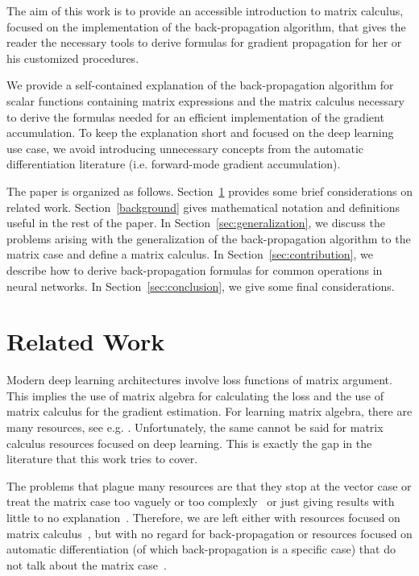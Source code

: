 \documentclass[pdflatex,sn-mathphys-num]{sn-jnl}%
\theoremstyle{thmstyleone}%
\theoremstyle{thmstyletwo}%
\theoremstyle{thmstylethree}%
\begin{document}
The aim of this work is to provide an accessible introduction to matrix calculus, focused on the implementation of the back-propagation algorithm, that gives the reader the necessary tools to derive formulas for gradient propagation for her or his customized procedures.

We provide a self-contained explanation of the back-propagation
algorithm for scalar functions containing matrix expressions and the matrix calculus necessary to derive the formulas needed for an efficient implementation
of the gradient accumulation. To keep the explanation short and focused on the
deep learning use case, we avoid introducing unnecessary concepts from the
automatic differentiation literature (i.e. forward-mode gradient accumulation).

The paper is organized as follows. Section~\ref{Relwork} provides some brief
considerations on related work. Section~\ref{background} gives mathematical
notation and definitions useful in the rest of the paper. In
Section~\ref{sec:generalization}, we discuss the problems arising with the
generalization of the back-propagation algorithm to the matrix case and define a
matrix calculus.  In Section~\ref{sec:contribution}, we describe how to derive
back-propagation formulas for common operations in neural networks.  In
Section~\ref{sec:conclusion}, we give some final considerations.

\section{Related Work}\label{Relwork}

Modern deep learning architectures involve loss functions of matrix argument.
This implies the use of matrix algebra for calculating the loss and the use of
matrix calculus for the gradient estimation.  For learning matrix algebra, there
are many resources, see e.g. \cite{strang2019,searle2017,magnus2005}.
Unfortunately, the same cannot be said for matrix calculus resources focused on
deep learning.  This is exactly the gap in the literature that this work tries
to cover.

The problems that plague many resources are that they stop at the vector case or
treat the matrix case too vaguely or too
complexly~\cite{giering1998,buithanh2023} or just giving results with little to
no explanation~\cite{giles2008}.  Therefore, we are left either with resources
focused on matrix calculus~\cite{magnus2019,turkington2001}, but with no regard
for back-propagation or resources focused on automatic differentiation (of which
back-propagation is a specific case) that do not talk about the matrix
case~\cite{griewank2008, naumann2011}.
\end{document}
